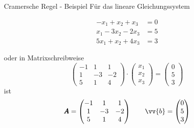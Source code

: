 \begin{frame}{Cramersche Regel - Beispiel}
	Für das lineare Gleichungssystem
	
		\begin{align*}
		- x_{1}  + x_{2}  + x_{3} & =  0 \\
		x_{1}  -3 x_{2}  -2 x_{3} & =  5 \\
		5 x_{1}  +x_{2}  +4 x_{3} & =  3
		\end{align*}

	oder in Matrixschreibweise
	\[
	\begin{pmatrix}
	-1 & 1 & 1 \\
	1 & -3 & -2 \\
	5 & 1 & 4
	\end{pmatrix} \cdot \begin{pmatrix}x_{1} \\ x_{2} \\ x_{3} \end{pmatrix} = \begin{pmatrix}
	0 \\ 5 \\ 3
	\end{pmatrix}
	\]
	ist
	\[
	\pmb{A}= \begin{pmatrix}
	-1 & 1 & 1 \\
	1 & -3 & -2 \\
	5 & 1 & 4
	\end{pmatrix}
	\qquad
	\vv{b} = \begin{pmatrix}
	0 \\ 5 \\ 3
	\end{pmatrix}
	\]
\end{frame}

